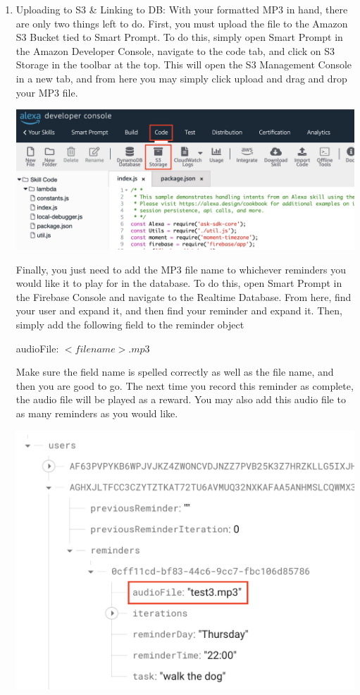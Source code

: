 \documentclass[11pt, oneside]{article}
\begin{document}
\begin{enumerate}
  \item Uploading to S3 \& Linking to DB:
  With your formatted MP3 in hand, there are only two things left to do. First, you must upload the file to the Amazon S3 Bucket tied to Smart Prompt. To do this, simply open Smart Prompt in the Amazon Developer Console, navigate to the code tab, and click on S3 Storage in the toolbar at the top. This will open the S3 Management Console in a new tab, and from here you may simply click upload and drag and drop your MP3 file.
\begin{center}
  \includegraphics[width=\linewidth * 3/4]{images/s3Location.png}
\end{center}

Finally, you just need to add the MP3 file name to whichever reminders you would like it to play for in the database. To do this, open Smart Prompt in the Firebase Console and navigate to the Realtime Database. From here, find your user and expand it, and then find your reminder and expand it. Then, simply add the following field to the reminder object
\begin{center}
audioFile: $<file name>.mp3$
\end{center}
Make sure the field name is spelled correctly as well as the file name, and then you are good to go. The next time you record this reminder as complete, the audio file will be played as a reward. You may also add this audio file to as many reminders as you would like.
\begin{center}
  \includegraphics[width=\linewidth * 1/2]{images/audioFileDBField.png}
\end{center}
\end{enumerate}
\end{document}
